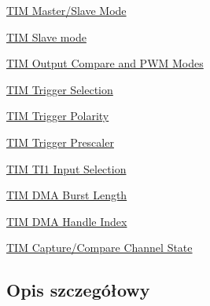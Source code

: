 \begin{DoxyCompactItemize}
\item 
\hyperlink{group___t_i_m___master___slave___mode}{T\+I\+M Master/\+Slave Mode}
\item 
\hyperlink{group___t_i_m___slave___mode}{T\+I\+M Slave mode}
\item 
\hyperlink{group___t_i_m___output___compare__and___p_w_m__modes}{T\+I\+M Output Compare and P\+W\+M Modes}
\item 
\hyperlink{group___t_i_m___trigger___selection}{T\+I\+M Trigger Selection}
\item 
\hyperlink{group___t_i_m___trigger___polarity}{T\+I\+M Trigger Polarity}
\item 
\hyperlink{group___t_i_m___trigger___prescaler}{T\+I\+M Trigger Prescaler}
\item 
\hyperlink{group___t_i_m___t_i1___selection}{T\+I\+M T\+I1 Input Selection}
\item 
\hyperlink{group___t_i_m___d_m_a___burst___length}{T\+I\+M D\+M\+A Burst Length}
\item 
\hyperlink{group___d_m_a___handle__index}{T\+I\+M D\+M\+A Handle Index}
\item 
\hyperlink{group___channel___c_c___state}{T\+I\+M Capture/\+Compare Channel State}
\end{DoxyCompactItemize}


\subsection{Opis szczegółowy}
